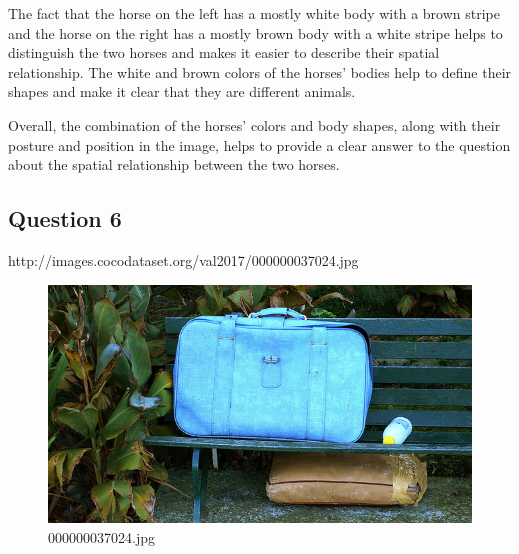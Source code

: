 \begin{enumerate}
        The fact that the horse on the left has a mostly white body with a brown stripe and the horse on the right has a mostly brown body with a white stripe helps to distinguish the two horses and makes it easier to describe their spatial relationship. The white and brown colors of the horses’ bodies help to define their shapes and make it clear that they are different animals.
        
        Overall, the combination of the horses’ colors and body shapes, along with their posture and position in the image, helps to provide a clear answer to the question about the spatial relationship between the two horses.
    \end{enumerate}
\subsection*{Question 6}
http://images.cocodataset.org/val2017/000000037024.jpg
    \begin{figure}[h]
        \centering
        \includegraphics[width=0.8\linewidth]{../image set/easy/000000037024.jpg}
        \caption{000000037024.jpg}
    \end{figure}
